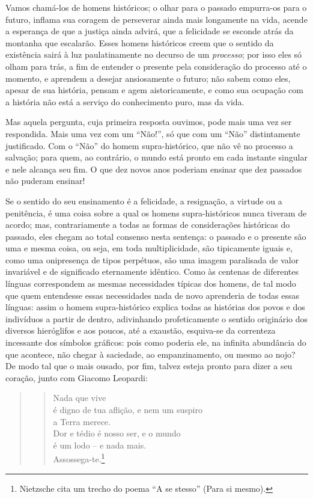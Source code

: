 Vamos chamá-los de homens históricos; o olhar para o passado empurra-os
para o futuro, inflama sua coragem de perseverar ainda mais longamente
na vida, acende a esperança de que a justiça ainda advirá, que a
felicidade se esconde atrás da montanha que escalarão. Esses homens
históricos creem que o sentido da existência sairá à luz paulatinamente
no decurso de um \emph{processo}; por isso eles só olham para trás, a
fim de entender o presente pela consideração do processo até o momento,
e aprendem a desejar ansiosamente o futuro; não sabem como eles, apesar
de sua história, pensam e agem aistoricamente, e como sua ocupação com a
história não está a serviço do conhecimento puro, mas da vida.

Mas aquela pergunta, cuja primeira resposta ouvimos, pode mais uma vez
ser respondida. Mais uma vez com um ``Não!'', só que com um ``Não''
distintamente justificado. Com o ``Não'' do homem supra-histórico, que não
vê no processo a salvação; para quem, ao contrário, o mundo está pronto
em cada instante singular e nele alcança seu fim. O que dez novos anos
poderiam ensinar que dez passados não puderam ensinar!

Se o sentido do seu ensinamento é a felicidade, a resignação, a virtude
ou a penitência, é uma coisa sobre a qual os homens supra-históricos
nunca tiveram de acordo; mas, contrariamente a todas as formas de
considerações históricas do passado, eles chegam ao total consenso nesta
sentença: o passado e o presente são uma e mesma coisa, ou seja, em toda
multiplicidade, são tipicamente iguais e, como uma onipresença de tipos
perpétuos, são uma imagem paralisada de valor invariável e de
significado eternamente idêntico.\label{eternamenteidentico} Como às centenas de diferentes línguas
correspondem as mesmas necessidades típicas dos homens, de tal modo que
quem entendesse essas necessidades nada de novo aprenderia de todas
essas línguas: assim o homem supra-histórico explica todas as histórias
dos povos e dos indivíduos a partir de dentro, adivinhando
profeticamente o sentido originário dos diversos hieróglifos e aos
poucos, até a exaustão, esquiva-se da correnteza incessante dos símbolos
gráficos: pois como poderia ele, na infinita abundância do que acontece,
não chegar à saciedade, ao empanzinamento, ou mesmo ao nojo? De modo tal
que o mais ousado, por fim, talvez esteja pronto para dizer a seu coração,
junto com Giacomo Leopardi:

\begin{quote}
\begin{verse}
Nada que vive\\
é digno de tua aflição, e nem um suspiro\\
a Terra merece.\\
Dor e tédio é nosso ser, e o mundo\\
é um lodo -- e nada mais.\\
Assossega-te.\footnote{Nietz\-sche cita um trecho do poema ``A se
  stesso'' (Para si mesmo).}
\end{verse}
\end{quote}

